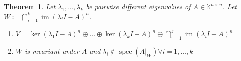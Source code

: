 \documentclass{article}
\newcounter{lecref}[section]
\numberwithin{lecref}{section}
\newtheorem{theorem}[lecref]{Theorem}
\DeclareMathOperator{\im}{im}
\begin{document}
\begin{theorem} %
  Let $\lambda_1, \dots, \lambda_k$ be pairwise different eigenvalues of $A \in \mathbb K^{n\times n}$.
  Let $W \coloneqq \bigcap_{i=1}^k \im(\lambda_i I - A)^n$.
  \begin{enumerate}
    \item $V = \ker(\lambda_1 I - A)^{n} \oplus \dots \oplus \ker(\lambda_k I - A)^n \oplus \bigcap_{i=1}^k \im(\lambda_i I - A)^n$
    \item $W$ is invariant under $A$ and $\lambda_i \not\in \operatorname{spec}(A|_W) \forall i = 1, \dots, k$
  \end{enumerate}
\end{theorem}
\end{document}
